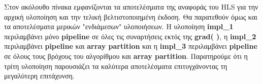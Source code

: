 Στον ακόλουθο πίνακα εμφανίζονται τα αποτελέσματα της αναφοράς του HLS για την αρχική υλοποίηση και την τελική βελτιστοποιημένη έκδοση. Θα παρατεθούν όμως και τα αποτελέσματα μερικών "ενδιάμεσων" υλοποιήσεων. Η υλοποίηση \textbf{impl\_1} περιλαμβάνει μόνο \textbf{pipeline} σε όλες τις συναρτήσεις εκτός της \textbf{grad( )}, η \textbf{impl\_2} περιλαμβάνει \textbf{pipeline} και \textbf{array partition} και η \textbf{impl\_3} περιλαμβάνει \textbf{pipeline} σε όλους τους βρόχους του αλγορίθμου και \textbf{array partition}. Παρατηρούμε ότι η τρίτη υλοποίηση παρουσιάζει τα καλύτερα αποτελέσματα επιτυγχάνοντας τη μεγαλύτερη επιτάχυνση.
\begin{table}[H]
\centering
{}
\caption{Σύγκριση υλοποιήσεων}
\end{table}

